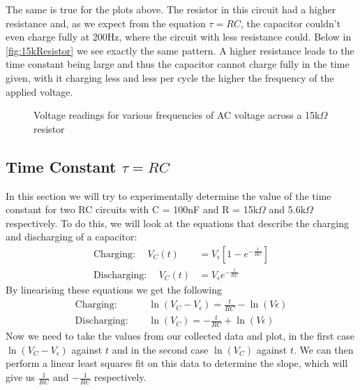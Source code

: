 \documentclass[12pt]{article}
\numberwithin{equation}{section}
\numberwithin{figure}{section}
\begin{document}
    The same is true for the plots above. The resistor in this circuit had a higher resistance and, as 
    we expect from the equation $\tau=RC$, the capacitor couldn't even charge fully at 200Hz, where the 
    circuit with less resistance could. \newline
    \newline
    Below in \autoref{fig:15kResistor} we see exactly the same pattern. A higher resistance leads to the 
    time constant being large and thus the capacitor cannot charge fully in the time given, with it charging 
    less and less per cycle the higher the frequency of the applied voltage.
    
    \begin{figure}[H]%
        \centering
        \qquad
        \qquad
        \qquad
        \caption{Voltage readings for various frequencies of AC voltage across a 15k$\Omega$ resistor}
        \label{fig:15kResistor}
    \end{figure}

    \subsection{Time Constant \texorpdfstring{$\tau=RC$}{t=RC}}
    In this section we will try to experimentally determine the value of the time constant for two RC circuits 
    with C = 100nF and R = 15k$\Omega$ and 5.6k$\Omega$ respectively. To do this, we will look at the equations 
    that describe the charging and discharging of a capacitor:
    \begin{align}
        \text{Charging:}\hspace{15pt} V_C(t)&=V_\epsilon[1-e^{-\frac{t}{RC}}] \label{eqn:CapCharging}\\
        \text{Discharging:}\hspace{15pt} V_C(t)&=V_\epsilon e^{-\frac{t}{RC}} \label{eqn:CapDischarging}
    \end{align}
    By linearising these equations we get the following
    \begin{align}
        \text{Charging:}\hspace{15pt} &\ln(V_C-V_\epsilon)=\frac{t}{RC}-\ln(V\epsilon) \label{eqn:CapChargingLinearised}\\
        \text{Discharging:}\hspace{15pt} &\ln(V_C)=-\frac{t}{RC}+\ln(V\epsilon) \label{eqn:CapDischargingLinearised}
    \end{align}
    Now we need to take the values from our collected data and plot, in the first case $\ln(V_C-V_\epsilon)$ 
    against $t$ and in the second case $\ln(V_C)$ against $t$. We can then perform a linear least squares fit 
    on this data to determine the slope, which will give us $\frac{1}{RC}$ and $-\frac{1}{RC}$ respectively. 
\end{document}
